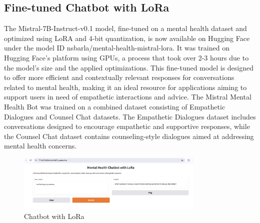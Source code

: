\subsection{Fine-tuned Chatbot with LoRa} 
The Mistral-7B-Instruct-v0.1 model, fine-tuned on a mental health dataset and optimized using LoRA and 4-bit quantization, is now available on Hugging Face under the model ID nsbarla/mental-health-mistral-lora. It was trained on Hugging Face's platform using GPUs, a process that took over 2-3 hours due to the model's size and the applied optimizations. This fine-tuned model is designed to offer more efficient and contextually relevant responses for conversations related to mental health, making it an ideal resource for applications aiming to support users in need of empathetic interactions and advice.
The Mistral Mental Health Bot was trained on a combined dataset consisting of Empathetic Dialogues and Counsel Chat datasets. The Empathetic Dialogues dataset includes conversations designed to encourage empathetic and supportive responses, while the Counsel Chat dataset contains counseling-style dialogues aimed at addressing mental health concerns.
\begin{figure}[h]
    \centering
    \includegraphics[width=0.8\textwidth]{chatbotwithlora.jpeg}
    \caption{Chatbot with LoRa}
    \label{fig:bot_lora}
\end{figure}

